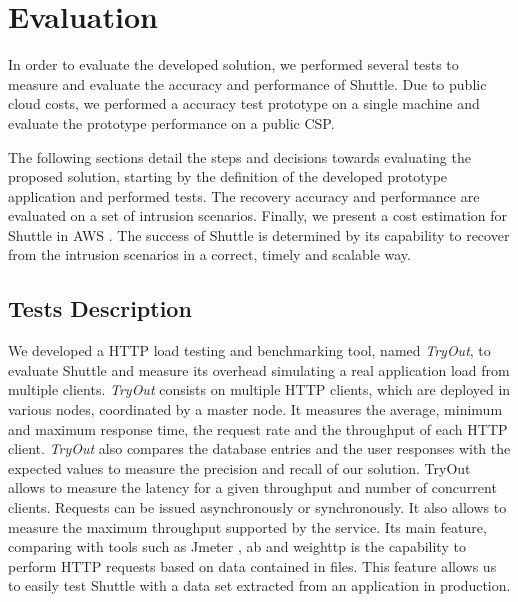 \chapter{Evaluation}\label{chapter:evaluation}
In order to evaluate the developed solution, we performed several tests to measure and evaluate the accuracy and performance of Shuttle. Due to public cloud costs, we performed a accuracy test prototype on a single machine and evaluate the prototype performance on a public \acf{CSP}.

The following sections detail the steps and decisions towards evaluating the proposed solution, starting by the definition of the developed prototype application and performed tests. The recovery accuracy and performance are evaluated on a set of intrusion scenarios. Finally, we present a cost estimation for Shuttle in \ac{AWS} \cite{aws}. The success of Shuttle is determined by its capability to recover from the intrusion scenarios in a correct, timely and scalable way.


\section{Tests Description}\label{sec:eval:test_description}

We developed a \ac{HTTP} load testing and benchmarking tool, named \emph{TryOut}, to evaluate Shuttle and measure its overhead simulating a real application load from multiple clients. \emph{TryOut} consists on multiple \ac{HTTP} clients, which are deployed in various nodes, coordinated by a master node. It measures the average, minimum and maximum response time, the request rate and the throughput of each \ac{HTTP} client. \emph{TryOut} also compares the database entries and the user responses with the expected values to measure the precision and recall of our solution. TryOut allows to measure the latency for a given throughput and number of concurrent clients. Requests can be issued asynchronously or synchronously. It also allows to measure the maximum throughput supported by the service. Its main feature, comparing with tools such as Jmeter \cite{jmeter}, ab \cite{ab} and weighttp \cite{weighttp} is the capability to perform \ac{HTTP} requests based on data contained in files. This feature allows us to easily test Shuttle with a data set extracted from an application in production.

